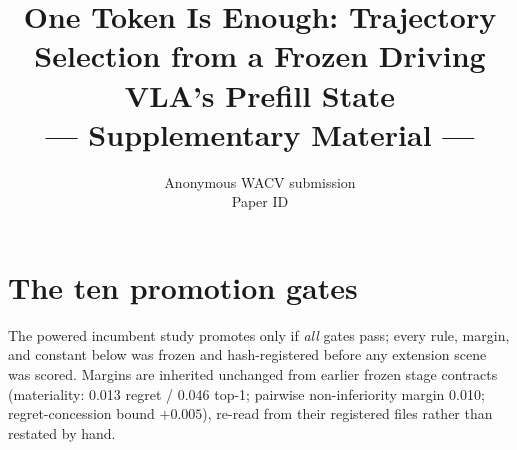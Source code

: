 \documentclass[10pt,twocolumn,letterpaper]{article}
\title{One Token Is Enough: Trajectory Selection from a Frozen Driving VLA's Prefill State\\ --- Supplementary Material ---}
\author{Anonymous WACV submission\\ Paper ID \wacvPaperID}
\begin{document}
\maketitle
\appendix

\section{The ten promotion gates}
\label{supp:gates}

The powered incumbent study promotes only if \emph{all} gates pass; every rule, margin, and constant below was frozen and hash-registered before any extension scene was scored.
Margins are inherited unchanged from earlier frozen stage contracts (materiality: 0.013 regret / 0.046 top-1; pairwise non-inferiority margin 0.010; regret-concession bound $+0.005$), re-read from their registered files rather than restated by hand.
\end{document}
